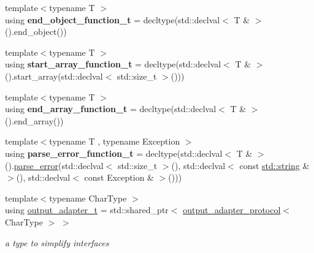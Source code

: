 \begin{DoxyCompactItemize}
\item 
\mbox{\label{namespacenlohmann_1_1detail_af52d6d2521c386998ae940d118182ebc}} 
{\footnotesize template$<$typename T $>$ }\\using {\bfseries end\+\_\+object\+\_\+function\+\_\+t} = decltype(std\+::declval$<$ T \& $>$().end\+\_\+object())
\item 
\mbox{\label{namespacenlohmann_1_1detail_a80273cecc45765d7b2826ec931fbffdd}} 
{\footnotesize template$<$typename T $>$ }\\using {\bfseries start\+\_\+array\+\_\+function\+\_\+t} = decltype(std\+::declval$<$ T \& $>$().start\+\_\+array(std\+::declval$<$ std\+::size\+\_\+t $>$()))
\item 
\mbox{\label{namespacenlohmann_1_1detail_aec53c029383b34a72182210e58fadb79}} 
{\footnotesize template$<$typename T $>$ }\\using {\bfseries end\+\_\+array\+\_\+function\+\_\+t} = decltype(std\+::declval$<$ T \& $>$().end\+\_\+array())
\item 
\mbox{\label{namespacenlohmann_1_1detail_a264d4d58bc1fd82bcc7bf6bf73d6acad}} 
{\footnotesize template$<$typename T , typename Exception $>$ }\\using {\bfseries parse\+\_\+error\+\_\+function\+\_\+t} = decltype(std\+::declval$<$ T \& $>$().\hyperlink{classnlohmann_1_1detail_1_1parse__error}{parse\+\_\+error}(std\+::declval$<$ std\+::size\+\_\+t $>$(), std\+::declval$<$ const \hyperlink{namespacenlohmann_1_1detail_a1ed8fc6239da25abcaf681d30ace4985ab45cffe084dd3d20d928bee85e7b0f21}{std\+::string} \& $>$(), std\+::declval$<$ const Exception \& $>$()))
\item 
\mbox{\label{namespacenlohmann_1_1detail_a9b680ddfb58f27eb53a67229447fc556}} 
{\footnotesize template$<$typename Char\+Type $>$ }\\using \hyperlink{namespacenlohmann_1_1detail_a9b680ddfb58f27eb53a67229447fc556}{output\+\_\+adapter\+\_\+t} = std\+::shared\+\_\+ptr$<$ \hyperlink{structnlohmann_1_1detail_1_1output__adapter__protocol}{output\+\_\+adapter\+\_\+protocol}$<$ Char\+Type $>$ $>$
\begin{DoxyCompactList}\small\item\em a type to simplify interfaces \end{DoxyCompactList}\end{DoxyCompactItemize}
